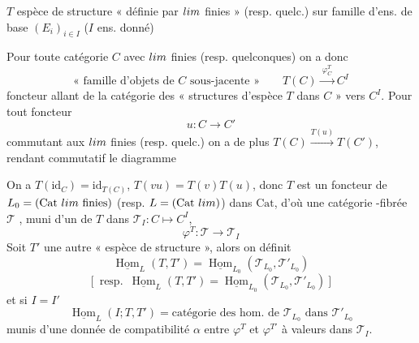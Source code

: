 \documentclass[11pt,a4paper]{article}
\begin{document}


$T$ espèce de structure « définie par $\varprojlim$ finies » (resp. quelc.) sur
famille d'ens. de base $(E_{i})_{i \in I}$ \quad ($I$ ens. donné)

Pour toute catégorie $C$ avec $\varprojlim$ finies (resp. quelconques) on a donc
\[
\text{« famille d'objets de } C \text{ sous-jacente »} \qquad
T(C) \xrightarrow{\ \varphi^{T}_{C}\ } C^{I}
\]
foncteur allant de la catégorie des « structures d'espèce $T$ dans $C$ » vers
$C^{I}$. Pour tout foncteur
\[
u : C \longrightarrow C'
\]
commutant aux $\varprojlim$ finies (resp. quelc.) on a de plus
$T(C) \xrightarrow{T(u)} T(C')$, rendant commutatif le diagramme


On a $T(\mathrm{id}_{C}) = \mathrm{id}_{T(C)}$, $T(vu) = T(v)T(u)$, donc $T$ est
un foncteur de $L_{0} = (\mathrm{Cat}\ \varprojlim \text{ finies})$ (resp.
$L = (\mathrm{Cat}\ \varprojlim)$) dans $\mathrm{Cat}$, d'où  une
catégorie \ill{}-fibrée $\mathcal{T}$ \ill{}, muni d'un  \ill{}
de $T$ dans $\mathcal{T}_{I} : C \mapsto C^{I}$,
\[
\varphi^{T} : \mathcal{T} \longrightarrow \mathcal{T}_{I}
\]
Soit $T'$ une autre « espèce de structure », alors on définit
\[
\underline{\operatorname{Hom}}_{L}(T, T') =
\underline{\operatorname{Hom}}_{L_{0}}(\mathcal{T}_{L_{0}}, \mathcal{T}'_{L_{0}})
\]
\[
\bigl[\ \operatorname{resp.}\ \underline{\operatorname{Hom}}_{L}(T, T') =
\underline{\operatorname{Hom}}_{L_{0}}(\mathcal{T}_{L_{0}},
\mathcal{T}'_{L_{0}}) \ \bigr]
\]
et si $I = I'$
\[
\underline{\operatorname{Hom}}_{L}(I ; T, T') = \text{catégorie des hom. de }
\mathcal{T}_{L_{0}} \text{ dans } \mathcal{T}'_{L_{0}}
\]
munis d'une donnée de compatibilité $\alpha$ entre $\varphi^{T}$ et
$\varphi^{T'}$ à valeurs dans $\mathcal{T}_{I}$.

\end{document}
